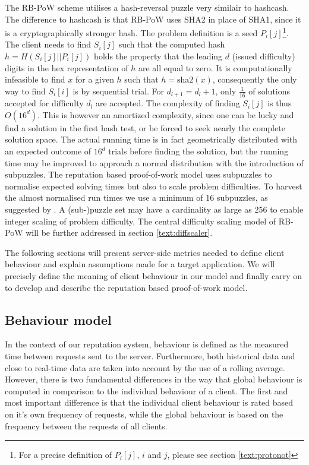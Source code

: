 The RB-PoW scheme utilises a hash-reversal puzzle very similair to hashcash. The difference to hashcash is that RB-PoW uses SHA2 in place of SHA1, since it is a cryptographically stronger hash.
The problem definition is a seed $P_i[j]$\footnote{For a precise definition of $P_i[j]$, $i$ and $j$, please see section \ref{text:protonot}}.
The client needs to find $S_i[j]$ such that the computed hash $ h = H(S_i[j]||P_i[j])$ holds the property that the leading $d$ (issued difficulty) digits in the hex representation of $h$ are all equal to zero. 
It is computationally infeasible to find $x$  for a given $h$ such that $ h = \mbox{sha2}(x)$\cite{sha2}, consequently the only way to find $S_i[i]$ is by sequential trial. For $d_{l+1} = d_l + 1 $, only $\frac{1}{16}$ of solutions accepted for difficulty $d_l$ are accepted.
The complexity of finding $S_i[j]$ is thus $O(16^d)$. This is however an amortized complexity, since one can be lucky and find a solution in the first hash test, or be forced to seek nearly the complete solution space.
The actual running time is in fact geometrically distributed with an expected outcome of $16^d$ trials before finding the solution, but the running time may be improved to approach a normal distribution with the introduction of subpuzzles\cite{subpuzzles}. 
The reputation based proof-of-work model uses subpuzzles to normalise expected solving times but also to scale problem difficulties. To harvest the almost normalised run times we use a minimum of 16 subpuzzles, as suggested by \citeauthor{subpuzzles}. A (sub-)puzzle set may have a cardinality as large as 256 to enable integer scaling of problem difficulty. The central difficulty scaling model of RB-PoW will be further addressed in section \ref{text:diffscaler}.



The following sections will present server-side metrics needed to define client behaviour and explain assumptions made for a target application. 
We will precisely define the meaning of client behaviour in our model and finally carry on to develop and describe the reputation based proof-of-work model.



\subsection{Behaviour model}\label{tab:behaviourmodel}
In the context of our reputation system, behaviour is defined as the measured time between requests sent to the server. Furthermore, both historical data and close to real-time data are taken into account by the use of a rolling average. However, there is two fundamental differences in the way that global behaviour is computed in comparison to the individual behaviour of a client. The first and most important difference is that the individual client behaviour is rated based on it's own frequency of requests, while the global behaviour is based on the frequency between the requests of all clients. 


